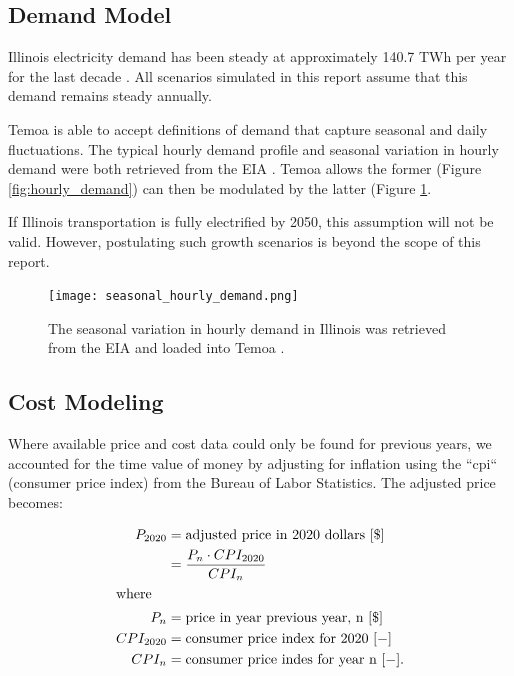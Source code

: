 \subsection{Demand Model}
Illinois electricity demand has been steady at approximately 140.7 TWh per year
for the last decade
\cite{us_energy_information_administration_eia_illinois_2020}. All scenarios
simulated in this report assume that this demand remains steady annually.

Temoa is able to accept definitions of demand that capture seasonal and daily 
fluctuations. The typical hourly demand profile and seasonal variation in 
hourly demand were both retrieved from the \gls{EIA} 
\cite{us_energy_information_administration_eia_illinois_2020}.  
Temoa allows the former 
(Figure \ref{fig:hourly_demand}) can then be 
modulated by the latter (Figure \ref{fig:seasonal_hourly_demand}. 

If Illinois transportation is fully electrified by 2050, this assumption will
not be valid.  However, postulating such growth scenarios is  beyond the scope 
of this report. 


\begin{figure}[htbp!]
        \begin{center}
               \texttt{[image: seasonal\_hourly\_demand.png]}
        \end{center}
        \caption{The seasonal variation in hourly demand in Illinois was retrieved from the \gls{EIA} 
        \cite{us_energy_information_administration_eia_illinois_2020} and 
        loaded into Temoa \cite{decarolis_modelling_2016}.}
        \label{fig:seasonal_hourly_demand}
\end{figure}

\subsection{Cost Modeling}
Where available price and cost data could only be found for previous years, we 
                accounted for the time value of money by adjusting for 
                inflation using the ``cpi`` (consumer price index) from the 
                Bureau of Labor Statistics. The adjusted price becomes: 

\begin{align}
        P_{2020} &= \mbox{adjusted price in 2020 dollars }[\$]\\
                &= \frac{P_{n} \cdot CPI_{2020}}{CPI_{n}}\\
        \intertext{where}
        P_n &= \mbox{price in year previous year, n } [\$]\\
        CPI_{2020} &= \mbox{consumer price index for 2020 } [-]\\
        CPI_n &= \mbox{consumer price indes for year n } [-].
\end{align}


